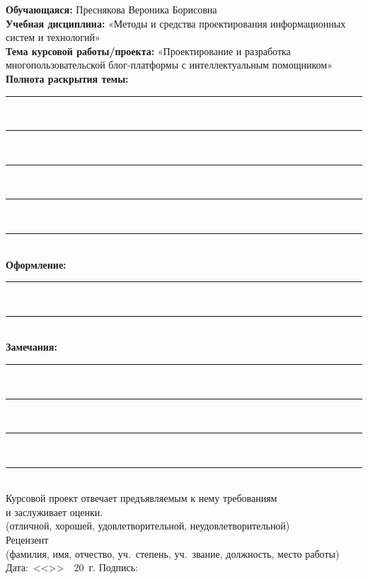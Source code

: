 \documentclass[a4paper,14pt]{extreport}
\begin{document}
\vspace{1.5mm}
\noindent\textbf{Обучающаяся:} Преснякова Вероника Борисовна\\[1mm]
\noindent\textbf{Учебная дисциплина:} «Методы и средства проектирования информационных систем и технологий»\\[1mm]
\noindent\textbf{Тема курсовой работы/проекта:} «Проектирование и разработка многопользовательской блог-платформы с интеллектуальным помощником»\\[2mm]
\noindent\textbf{Полнота раскрытия темы:}\\[-1.5mm]
\rule{\linewidth}{0.4pt}\\[2.2mm]
\rule{\linewidth}{0.4pt}\\[2.2mm]
\rule{\linewidth}{0.4pt}\\[2.2mm]
\rule{\linewidth}{0.4pt}\\[2.2mm]
\rule{\linewidth}{0.4pt}\\[1.5mm]
\noindent\textbf{Оформление:}\\[-1.5mm]
\rule{\linewidth}{0.4pt}\\[2.2mm]
\rule{\linewidth}{0.4pt}\\[1.5mm]
\noindent\textbf{Замечания:}\\[-1.5mm]
\rule{\linewidth}{0.4pt}\\[2.2mm]
\rule{\linewidth}{0.4pt}\\[2.2mm]
\rule{\linewidth}{0.4pt}\\[2.2mm]
\rule{\linewidth}{0.4pt}\\[2mm]
\noindent Курсовой проект отвечает предъявляемым к нему требованиям\\
и заслуживает \underline{\hspace{40mm}} оценки.\\
\null\hfill{\fontsize{8.5pt}{10pt}\selectfont (отличной, хорошей, удовлетворительной, неудовлетворительной)}\hfill\null\\[2mm]
\noindent Рецензент \underline{\hspace{120mm}}\\
\null\hfill{\fontsize{8pt}{9.5pt}\selectfont (фамилия, имя, отчество, уч.~степень, уч.~звание, должность, место работы)}\hfill\null\\[3mm]
\noindent\mbox{Дата: <<\underline{\hspace{8mm}}>> \underline{\hspace{25mm}} 20\underline{\hspace{6mm}}~г.} \hfill \mbox{Подпись: \underline{\hspace{35mm}}}
\end{document}
